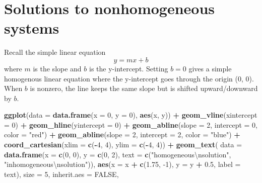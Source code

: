 \documentclass[
]{book}
\newenvironment{Shaded}{\begin{snugshade}}{\end{snugshade}}
\newcommand{\CharTok}[1]{\textcolor[rgb]{0.31,0.60,0.02}{#1}}
\newcommand{\DataTypeTok}[1]{\textcolor[rgb]{0.13,0.29,0.53}{#1}}
\newcommand{\DecValTok}[1]{\textcolor[rgb]{0.00,0.00,0.81}{#1}}
\newcommand{\FloatTok}[1]{\textcolor[rgb]{0.00,0.00,0.81}{#1}}
\newcommand{\KeywordTok}[1]{\textcolor[rgb]{0.13,0.29,0.53}{\textbf{#1}}}
\newcommand{\NormalTok}[1]{#1}
\newcommand{\OperatorTok}[1]{\textcolor[rgb]{0.81,0.36,0.00}{\textbf{#1}}}
\newcommand{\OtherTok}[1]{\textcolor[rgb]{0.56,0.35,0.01}{#1}}
\newcommand{\StringTok}[1]{\textcolor[rgb]{0.31,0.60,0.02}{#1}}
\theoremstyle{definition}
\theoremstyle{definition}
\theoremstyle{definition}
\theoremstyle{definition}
\theoremstyle{remark}
\begin{document}
\hypertarget{solutions-to-nonhomogeneous-systems}{%
\section{Solutions to nonhomogeneous systems}\label{solutions-to-nonhomogeneous-systems}}

Recall the simple linear equation
\[
y = mx + b
\]
where \(m\) is the slope and \(b\) is the y-intercept. Setting \(b = 0\) gives a simple homogenous linear equation where the y-intercept goes through the origin (0, 0). When \(b\) is nonzero, the line keeps the same slope but is shifted upward/downward by \(b\).

\begin{Shaded}
\begin{Highlighting}[]
\KeywordTok{ggplot}\NormalTok{(}\DataTypeTok{data =} \KeywordTok{data.frame}\NormalTok{(}\DataTypeTok{x =} \DecValTok{0}\NormalTok{, }\DataTypeTok{y =} \DecValTok{0}\NormalTok{), }\KeywordTok{aes}\NormalTok{(x, y)) }\OperatorTok{+}
\StringTok{    }\KeywordTok{geom_vline}\NormalTok{(}\DataTypeTok{xintercept =} \DecValTok{0}\NormalTok{) }\OperatorTok{+}
\StringTok{    }\KeywordTok{geom_hline}\NormalTok{(}\DataTypeTok{yintercept =} \DecValTok{0}\NormalTok{) }\OperatorTok{+}
\StringTok{    }\KeywordTok{geom_abline}\NormalTok{(}\DataTypeTok{slope =} \DecValTok{2}\NormalTok{, }\DataTypeTok{intercept =} \DecValTok{0}\NormalTok{, }\DataTypeTok{color =} \StringTok{"red"}\NormalTok{) }\OperatorTok{+}
\StringTok{    }\KeywordTok{geom_abline}\NormalTok{(}\DataTypeTok{slope =} \DecValTok{2}\NormalTok{, }\DataTypeTok{intercept =} \DecValTok{2}\NormalTok{, }\DataTypeTok{color =} \StringTok{"blue"}\NormalTok{) }\OperatorTok{+}
\StringTok{    }\KeywordTok{coord_cartesian}\NormalTok{(}\DataTypeTok{xlim =} \KeywordTok{c}\NormalTok{(}\OperatorTok{-}\DecValTok{4}\NormalTok{, }\DecValTok{4}\NormalTok{), }\DataTypeTok{ylim =} \KeywordTok{c}\NormalTok{(}\OperatorTok{-}\DecValTok{4}\NormalTok{, }\DecValTok{4}\NormalTok{))  }\OperatorTok{+}
\StringTok{    }\KeywordTok{geom_text}\NormalTok{(}
        \DataTypeTok{data =} \KeywordTok{data.frame}\NormalTok{(}\DataTypeTok{x =} \KeywordTok{c}\NormalTok{(}\DecValTok{0}\NormalTok{, }\DecValTok{0}\NormalTok{), }\DataTypeTok{y =} \KeywordTok{c}\NormalTok{(}\DecValTok{0}\NormalTok{, }\DecValTok{2}\NormalTok{), }\DataTypeTok{text =} \KeywordTok{c}\NormalTok{(}\StringTok{"homogeneous}\CharTok{\textbackslash{}n}\StringTok{solution"}\NormalTok{, }\StringTok{"inhomogeneous}\CharTok{\textbackslash{}n}\StringTok{solution"}\NormalTok{)),}
        \KeywordTok{aes}\NormalTok{(}\DataTypeTok{x =}\NormalTok{ x }\OperatorTok{+}\StringTok{ }\KeywordTok{c}\NormalTok{(}\FloatTok{1.75}\NormalTok{, }\DecValTok{-1}\NormalTok{), }\DataTypeTok{y =}\NormalTok{ y }\OperatorTok{+}\StringTok{ }\FloatTok{0.5}\NormalTok{, }\DataTypeTok{label =}\NormalTok{ text), }\DataTypeTok{size =} \DecValTok{5}\NormalTok{, }\DataTypeTok{inherit.aes =} \OtherTok{FALSE}\NormalTok{,}

\end{Highlighting}
\end{Shaded}
\end{document}
